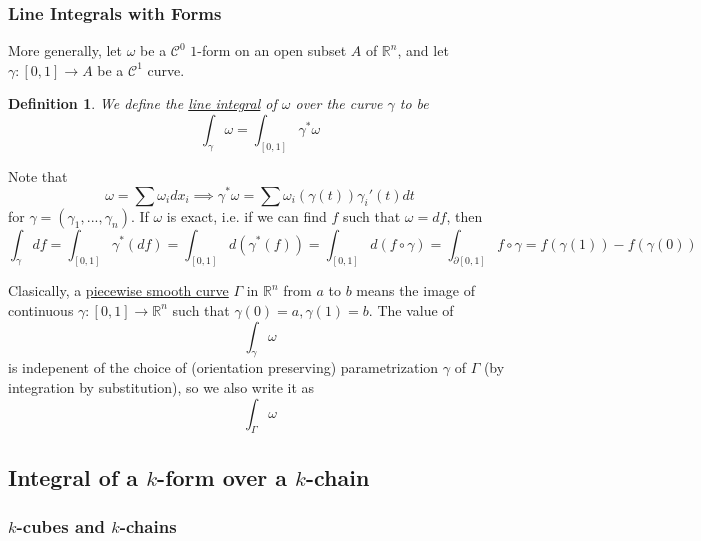\documentclass{article}
\newtheorem{definition}{Definition}
\newcommand{\reals}[0]{\mathbb{R}}
\newcommand{\mc}[1]{\mathcal{#1}}
\begin{document}
\subsubsection{Line Integrals with Forms}

More generally, let \(\omega\) be a \(\mc{C}^0\) \(1\)-form on an open subset \(A\) of \(\reals^n\), and let \(\gamma: [0, 1] \to A\) be a \(\mc{C}^1\) curve.
\begin{definition}

We define the \underline{line integral} of \(\omega\) over the curve \(\gamma\) to be
\begin{equation}
  \int_{\gamma}\omega = \int_{[0, 1]}\gamma^*\omega
\end{equation}

\end{definition}
Note that
\begin{equation}
  \omega = \sum\omega_idx_i \implies \gamma^*\omega = \sum\omega_i(\gamma(t))\gamma_i'(t)dt
\end{equation}
for \(\gamma = (\gamma_1,...,\gamma_n)\). If \(\omega\) is exact, i.e.  if we can find \(f\) such that \(\omega = df\), then
\begin{equation}
  \int_\gamma df = \int_{[0, 1]}\gamma^*(df) = \int_{[0, 1]}d(\gamma^*(f)) = \int_{[0, 1]}d(f \circ \gamma) = \int_{\partial[0, 1]}f \circ \gamma = f(\gamma(1)) - f(\gamma(0))
\end{equation}

Clasically, a \underline{piecewise smooth curve} \(\Gamma\) in \(\reals^n\) from \(a\) to \(b\) means the image of continuous \(\gamma: [0, 1] \to \reals^n\) such that \(\gamma(0) = a, \gamma(1) = b\). The value of
\begin{equation}
  \int_\gamma\omega
\end{equation}
is indepenent of the choice of (orientation preserving) parametrization \(\gamma\) of \(\Gamma\) (by integration by substitution), so we also write it as
\begin{equation}
  \int_{\Gamma}\omega
\end{equation}

\subsection{Integral of a \(k\)-form over a \(k\)-chain}

\subsubsection{\(k\)-cubes and \(k\)-chains}
\end{document}
